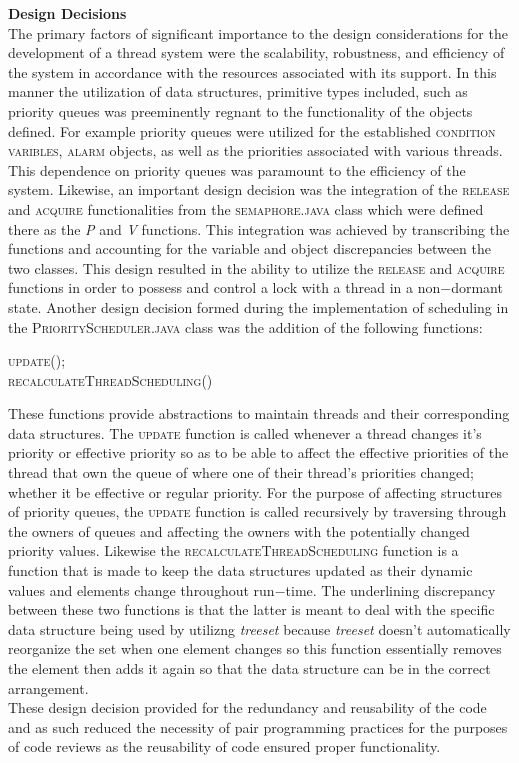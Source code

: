\documentclass[12pt]{article}
\begin{document}
{\setlength{\parindent}{0cm}
\textbf{Design Decisions} \\
The primary factors of significant importance to the design considerations for the development of a thread system were the scalability, robustness, and efficiency of the system in accordance with the resources associated with its support. In this manner the utilization of data structures, primitive types included, such as priority queues was preeminently regnant to the functionality of the objects defined. For example priority queues were utilized for the established \textsc{condition varibles}, \textsc{alarm} objects, as well as the priorities associated with various threads. This dependence on priority queues was paramount to the efficiency of the system. Likewise, an important design decision was the integration of the \textsc{release} and \textsc{acquire} functionalities from the \textsc{semaphore.java} class which were defined there as the \textit{P} and \textit{V} functions. This integration was achieved by transcribing the functions and accounting for the variable and object discrepancies between the two classes. This design resulted in the ability to utilize the \textsc{release} and \textsc{acquire} functions in order to possess and control a lock with a thread in a non$-$dormant state. Another design decision formed during the implementation of scheduling in the \textsc{PriorityScheduler.java} class was the addition of the following functions: \begin{center}\textsc{update();\\	recalculateThreadScheduling()}\end{center} These functions provide abstractions to maintain threads and their corresponding data structures. The \textsc{update} function is called whenever a thread changes it's priority or effective priority so as to be able to affect the effective priorities of the thread that own the queue of where one of their thread's priorities changed; whether it be effective or regular priority. For the purpose of affecting structures of priority queues, the \textsc{update} function is called recursively by traversing through the owners of queues and affecting the owners with the potentially changed priority values. Likewise the \textsc{recalculateThreadScheduling} function is a function that is made to keep the data structures updated as their dynamic values and elements change throughout run$-$time. The underlining discrepancy between these two functions is that the latter is meant to deal with the specific data structure being used by utilizng \textit{treeset} because \textit{treeset} doesn't automatically reorganize the set when one element changes so this function essentially removes the element then adds it again so that the data structure can be in the correct arrangement.\\These design decision provided for the redundancy and reusability of the code and as such reduced the necessity of pair programming practices for the purposes of code reviews as the reusability of code ensured proper functionality.\\\\ 
}
\end{document}
